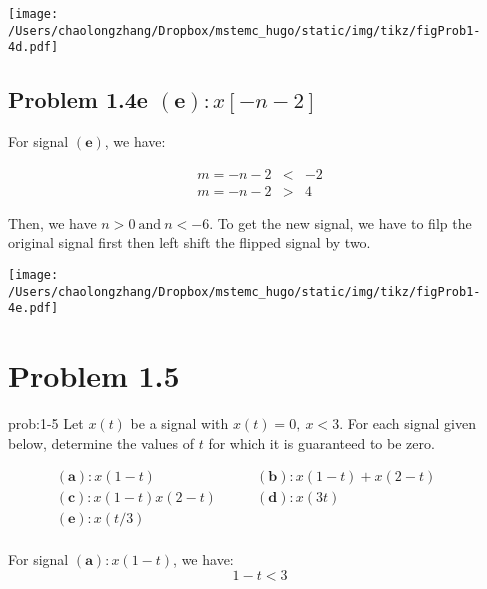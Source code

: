 \documentclass[koma,a4paper,utopia,12pt,listings-color,microtype,paralist,colorlinks,urlcolor=red]{org-article}
\begin{document}
\begin{center}
\texttt{[image: /Users/chaolongzhang/Dropbox/mstemc\_hugo/static/img/tikz/figProb1-4d.pdf]}
\end{center}



\subsection{Problem 1.4e \(\mathbf{(e)}: x[-n-2]\)}
\label{sec:org04ff18a}

For signal \(\mathbf{(e)}\), we have:

\begin{eqnarray*}
m=-n-2&<&-2 \\
m=-n-2&>&4
\end{eqnarray*}

Then, we have \(n>0 \ \mathrm{and}\ n<-6\). To get the new signal, we have
to filp the original signal first then left shift the flipped signal by two.

\begin{center}
\texttt{[image: /Users/chaolongzhang/Dropbox/mstemc\_hugo/static/img/tikz/figProb1-4e.pdf]}
\end{center}

\section{Problem 1.5}
\label{sec:org8c8f6ba}


\begin{prob}[]{prob:1-5}
Let \(x(t)\) be a signal with \(x(t)=0, \ x<3\). For each signal
given below, determine the values of \(t\) for which it is guaranteed to be
zero.

\begin{equation*}
\begin{array}{ll}
\mathbf{(a)}: x(1-t) \qquad  &   \mathbf{(b)}: x(1-t) + x(2-t)\qquad   \\
\mathbf{(c)}: x(1-t)x(2-t)\qquad &  \mathbf{(d)}: x(3t) \qquad  \\
  \mathbf{(e)}: x(t/3)\qquad & \\
\end{array}
\end{equation*}
\label{prob:1-5}
\end{prob}


For signal \(\mathbf{(a)}: x(1-t)\),  we have:
\begin{equation*}
1-t < 3
\end{equation*}
\end{document}
